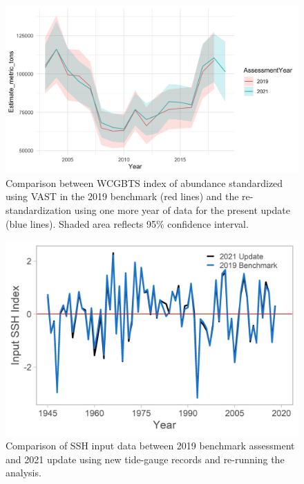 \documentclass[11pt,
  english,
  a4paper,
]{article}
\begin{document}
\begin{figure}
\centering
\includegraphics[width=1\textwidth,height=1\textheight]{figs/VAST_Comparisons.png}
\caption{Comparison between WCGBTS index of abundance standardized using VAST in the 2019 benchmark (red lines) and the re-standardization using one more year of data for the present update (blue lines). Shaded area reflects 95\% confidence interval. \label{fig:WCGBTindexcompare}}
\end{figure}

\tagmcend\tagstructend


\begin{figure}
\centering
\includegraphics[width=1\textwidth,height=1\textheight]{figs/ssh_compare.png}
\caption{Comparison of SSH input data between 2019 benchmark assessment and 2021 update using new tide-gauge records and re-running the analysis. \label{fig:ssh-plot}}
\end{figure}
\end{document}

